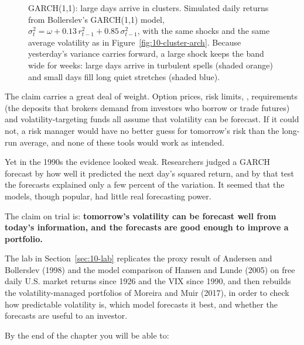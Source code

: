 \begin{figure}[htbp]
{%
}
\caption[GARCH(1,1): large days arrive in clusters]{GARCH(1,1): large days arrive in clusters. Simulated daily returns from Bollerslev's GARCH(1,1) model, $\sigma_t^2 = \omega + 0.13\,r_{t-1}^2 + 0.85\,\sigma_{t-1}^2$, with the same shocks and the same average volatility as in Figure~\ref{fig:10-cluster-arch}. Because yesterday's variance carries forward, a large shock keeps the band wide for weeks: large days arrive in turbulent spells (shaded orange) and small days fill long quiet stretches (shaded blue).}
\label{fig:10-cluster-garch}
\end{figure}


The claim carries a great deal of weight. Option prices, risk limits, ,  requirements (the deposits that brokers demand from investors who borrow or trade futures) and volatility-targeting funds all assume that volatility can be forecast. If it could not, a risk manager would have no better guess for tomorrow's risk than the long-run average, and none of these tools would work as intended.

Yet in the 1990s the evidence looked weak. Researchers judged a GARCH forecast by how well it predicted the next day's squared return, and by that test the forecasts explained only a few percent of the variation. It seemed that the models, though popular, had little real forecasting power.

The claim on trial is: \textbf{tomorrow's volatility can be forecast well from today's information, and the forecasts are good enough to improve a portfolio.}

The lab in Section~\ref{sec:10-lab} replicates the proxy result of Andersen and Bollerslev (1998) and the model comparison of Hansen and Lunde (2005) on free daily U.S. market returns since 1926 and the VIX since 1990, and then rebuilds the volatility-managed portfolios of Moreira and Muir (2017), in order to check how predictable volatility is, which model forecasts it best, and whether the forecasts are useful to an investor.

By the end of the chapter you will be able to:

